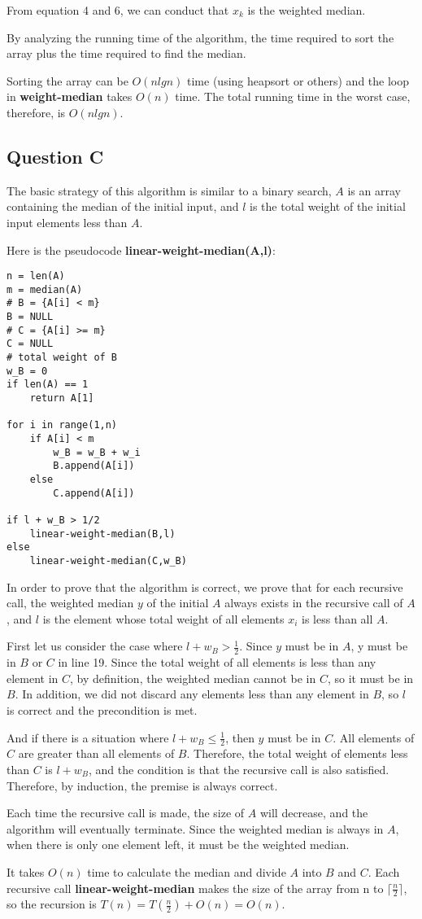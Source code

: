 \documentclass{article}
\begin{document}
From equation 4 and 6, we can conduct that $x_k$ is the weighted median.

By analyzing the running time of the algorithm, the time required to sort the array plus the time required to find the median.

Sorting the array can be $O(nlgn)$ time (using heapsort or others) and the loop in \textbf{weight-median} takes $O(n)$ time.
The total running time in the worst case, therefore, is $O(n lg n)$.


\subsection{Question C}

The basic strategy of this algorithm is similar to a binary search, 
$A$ is an array containing the median of the initial input, and $l$ is the total weight of the initial input elements less than $A$.

Here is the pseudocode \textbf{linear-weight-median(A,l)}:
\begin{lstlisting}
n = len(A)
m = median(A)
# B = {A[i] < m}
B = NULL
# C = {A[i] >= m}
C = NULL
# total weight of B
w_B = 0
if len(A) == 1
    return A[1]

for i in range(1,n)
    if A[i] < m
        w_B = w_B + w_i
        B.append(A[i])
    else 
        C.append(A[i])

if l + w_B > 1/2
    linear-weight-median(B,l)
else 
    linear-weight-median(C,w_B)

\end{lstlisting}

In order to prove that the algorithm is correct, we prove that for each recursive call, the weighted median $y$ of the initial $A$ always exists in the recursive call of $A$, and $l$ is the element whose total weight of all elements $x_i$ is less than all $A$.

First let us consider the case where $l + w_B > \frac{1}{2}$. 
Since $y$ must be in $A$, y must be in $B$ or $C$ in line 19. Since the total weight of all elements is less than any element in $C$, by definition, the weighted median cannot be in $C$, so it must be in $B$. In addition, we did not discard any elements less than any element in $B$, so $l$ is correct and the precondition is met.

And if there is a situation where $l + w_B \leq \frac{1}{2}$, then $y$ must be in $C$. All elements of $C$ are greater than all elements of $B$. Therefore, the total weight of elements less than $C$ is $l + w_B$, and the condition is that the recursive call is also satisfied. Therefore, by induction, the premise is always correct.

Each time the recursive call is made, the size of $A$ will decrease, and the algorithm will eventually terminate. Since the weighted median is always in $A$, when there is only one element left, it must be the weighted median.

It takes $O(n)$ time to calculate the median and divide $A$ into $B$ and $C$.
Each recursive call \textbf{linear-weight-median} makes the size of the array from n to $\lceil \frac{n}{2} \rceil $, so the recursion is $T(n) = T(\frac{n}{2}) + O(n) = O(n)$.
\end{document}
